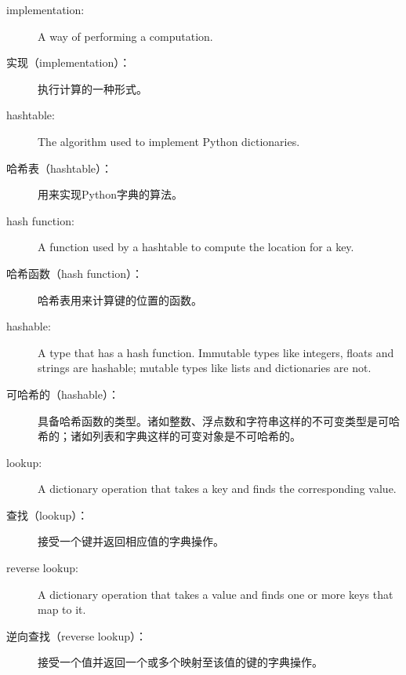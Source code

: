 \begin{description}

\item[implementation:] A way of performing a computation.


\item[实现（implementation）：] 执行计算的一种形式。


\item[hashtable:] The algorithm used to implement Python
dictionaries.


\item[哈希表（hashtable）：] 用来实现Python字典的算法。


\item[hash function:] A function used by a hashtable to compute the
location for a key.


\item[哈希函数（hash function）：] 哈希表用来计算键的位置的函数。


\item[hashable:] A type that has a hash function.  Immutable
types like integers,
floats and strings are hashable; mutable types like lists and
dictionaries are not.


\item[可哈希的（hashable）：] 具备哈希函数的类型。诸如整数、浮点数和字符串这样的不可变类型是可哈希的；诸如列表和字典这样的可变对象是不可哈希的。


\item[lookup:] A dictionary operation that takes a key and finds
the corresponding value.


\item[查找（lookup）：] 接受一个键并返回相应值的字典操作。


\item[reverse lookup:] A dictionary operation that takes a value and finds
one or more keys that map to it.


\item[逆向查找（reverse lookup）：] 接受一个值并返回一个或多个映射至该值的键的字典操作。


\end{description}
